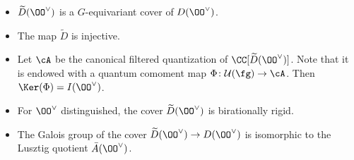 \documentclass[12pt]{amsart}
\begin{document}
    \begin{prop} \label{about cover} \cite[Proposition 9.2.1]{LMBM} 
        \begin{itemize}
            \item[(i)] $\widetilde{D}(\OO^\vee)$ is a $G$-equivariant cover of $D(\OO^\vee)$.
            \item[(ii)] The map $\widetilde{D}$ is injective.
            \item[(iii)] Let $\cA$ be the canonical filtered quantization of $\CC[\widetilde{D}(\OO^\vee)]$. Note that it is endowed with a quantum comoment map $\Phi\colon \mathcal{U}(\fg)\to \cA$. Then $\Ker(\Phi) = I(\OO^\vee)$.
            \item[(iv)] For $\OO^\vee$ distinguished, the cover $\widetilde{D}(\OO^\vee)$ is birationally rigid.
           \item[(v)] \cite[Remark 1.3]{MBMYu} The Galois group of the cover $\widetilde{D}(\OO^\vee)\to D(\OO^\vee)$ is isomorphic to the Lusztig quotient $\Bar{A}(\OO^\vee)$.
        \end{itemize}
    \end{prop}

\end{document}
